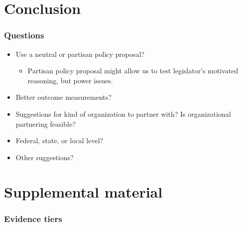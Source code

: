 \documentclass[usenames,dvipsnames]{beamer}
\begin{document}

\section{Conclusion}

\begin{frame}
\frametitle{Questions}
\begin{itemize}
\item Use a neutral or partisan policy proposal?
\begin{itemize}
\item Partisan policy proposal might allow us to test legislator's motivated reasoning, but power issues.
\end{itemize}
\item Better outcome measurements?
\item Suggestions for kind of organization to partner with? Is organizational partnering feasible?
\item Federal, state, or local level?
\item Other suggestions?
\end{itemize}

\end{frame}


\appendix

\section{Supplemental material}

\begin{frame}[label= doe_evidence]
\frametitle{Evidence tiers}


\end{frame}
\end{document}
